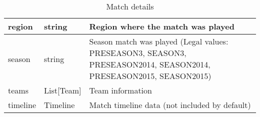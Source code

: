 \begin{table}[!htb]
\begin{tabular}{|llp{5cm}|}
region                & string                        & Region where the match was played                                                                                                                                                                                                                                                                                                                                                                                                                                                                                                                                                                                                       \\ \hline
season                & string                        & Season match was played (Legal values: PRESEASON3, SEASON3, PRESEASON2014, SEASON2014, PRESEASON2015, SEASON2015)                                                                                                                                                                                                                                                                                                                                                                                                                                                                                                                       \\ \hline
teams                 & List{[}Team{]}                & Team information                                                                                                                                                                                                                                                                                                                                                                                                                                                                                                                                                                                                                        \\ \hline
timeline              & Timeline                      & Match timeline data (not included by default)                                                                                                                                                                                                                                                                                                                                                                                                                                                                                                                                                                                           \\ \hline
\end{tabular}
\caption{Match details}\label{tab:match}
\end{table}

